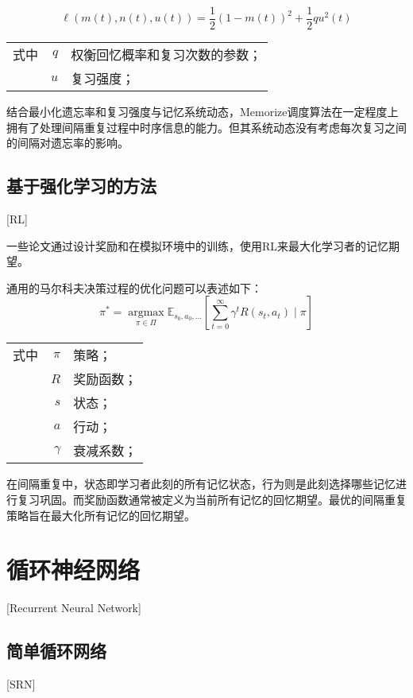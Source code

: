 \begin{equation}
    \ell(m(t), n(t), u(t))=\frac{1}{2}(1-m(t))^{2}+\frac{1}{2} q u^{2}(t)
\end{equation}
\begin{tabularx}{\textwidth}{@{}l@{\quad}r@{———}X@{}}
    式中& $q$ &权衡回忆概率和复习次数的参数；\\
    & $u$ &复习强度；
\end{tabularx}\vspace{3.15bp}

结合最小化遗忘率和复习强度与记忆系统动态，Memorize调度算法在一定程度上拥有了处理间隔重复过程中时序信息的能力。但其系统动态没有考虑每次复习之间的间隔对遗忘率的影响。

\subsection{基于强化学习的方法}[RL]

一些论文\cite{reddyAcceleratingHumanLearning2017,upadhyayDeepReinforcementLearning2018,sinhaUsingDeepReinforcement2019,yangTADSLearningTimeaware2020}通过设计奖励和在模拟环境中的训练，使用RL来最大化学习者的记忆期望。

通用的马尔科夫决策过程的优化问题可以表述如下：
\begin{equation}
    \pi^{*}=\underset{\pi \in \Pi}{\operatorname{argmax}} \mathbb{E}_{s_{0}, a_{0}, \ldots}\left[\sum_{t=0}^{\infty} \gamma^{t} R(s_{t}, a_{t}) \mid \pi\right]
\end{equation}
\begin{tabularx}{\textwidth}{@{}l@{\quad}r@{———}X@{}}
    式中& $\pi$ &策略；\\
    & $R$ &奖励函数；\\
    & $s$ &状态；\\
    & $a$ &行动；\\
    & $\gamma$ &衰减系数；
\end{tabularx}\vspace{3.15bp}

在间隔重复中，状态即学习者此刻的所有记忆状态，行为则是此刻选择哪些记忆进行复习巩固。而奖励函数通常被定义为当前所有记忆的回忆期望。最优的间隔重复策略旨在最大化所有记忆的回忆期望。

\section{循环神经网络}[Recurrent Neural Network]

\subsection{简单循环网络}[SRN]

